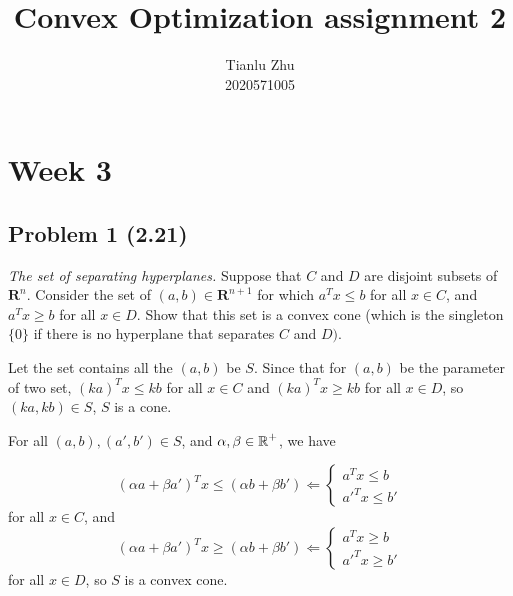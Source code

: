 \documentclass[en,hazy,blue,10pt,device = normal]{elegantnote}
\title{Convex Optimization assignment 2}
\author{Tianlu Zhu \\ 2020571005}
\date{}
\begin{document}
\maketitle

\section*{Week 3}
\subsection*{Problem 1 (2.21)}
\textit{The set of separating hyperplanes.} Suppose that \(C\) and \(D\) are disjoint subsets of \(\mathbf{R}^n\). Consider the set of \((a, b) \in \mathbf{R}^{n+1}\) for which \(a^T x \leq b\) for all \(x \in C\), and \(a^T x \geq b\) for all \(x \in D\). Show that this set is a convex cone (which is the singleton \(\{0\}\) if there is no hyperplane that separates \(C\) and \(D)\).

\begin{tcolorbox}
    \sol 

    Let the set contains all the \((a,b)\) be \(S\). Since that for \((a,b)\) be the parameter of two set, \((ka)^T x \leq kb\) for all \(x\in C\) and \((ka)^T x \geq kb\) for all \(x \in D\), so \((ka,kb) \in S\), \(S\) is a cone.

    For all \((a,b),(a',b')\in S\), and \(\alpha,\beta \in \operatorname{\mathbb R}^+\), we have

    \[(\alpha a+\beta a')^T x \leq (\alpha b + \beta b') \Leftarrow \begin{cases}
        a^T x \leq b \\
        a'^T x \leq b'
    \end{cases} \]
    for all \(x \in C\), and
    \[(\alpha a+\beta a')^T x \geq (\alpha b + \beta b') \Leftarrow \begin{cases}
        a^T x \geq b \\
        a'^T x \geq b'
    \end{cases} \]
    for all \(x\in D\), so \(S \) is a convex cone.
\end{tcolorbox}
\end{document}
